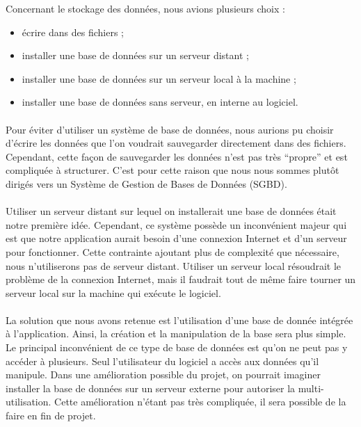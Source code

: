 Concernant le stockage des données, nous avions plusieurs choix :
\begin{itemize}
\item écrire dans des fichiers ;
\item installer une base de données sur un serveur distant ;
\item installer une base de données sur un serveur local à la machine ;
\item installer une base de données sans serveur, en interne au logiciel.
\end{itemize}

\paragraph{}
Pour éviter d’utiliser un système de base de données, nous aurions pu choisir
d’écrire les données que l’on voudrait sauvegarder directement dans des
fichiers. Cependant, cette façon de sauvegarder les données n’est pas très
“propre” et est compliquée à structurer. C’est pour cette raison que nous nous
sommes plutôt dirigés vers un Système de Gestion de Bases de Données (SGBD).

\paragraph{}
Utiliser un serveur distant sur lequel on installerait une base de données
était notre première idée. Cependant, ce système possède un inconvénient
majeur qui est que notre application aurait besoin d’une connexion Internet
et d’un serveur pour fonctionner. Cette contrainte ajoutant plus de complexité
que nécessaire, nous n'utiliserons pas de serveur distant. Utiliser un serveur
local résoudrait le problème de la connexion Internet, mais il faudrait tout
de même faire tourner un serveur local sur la machine qui exécute le logiciel.

\paragraph{}
La solution que nous avons retenue est l’utilisation d’une base de donnée
intégrée à l’application. Ainsi, la création et la manipulation de la base
sera plus simple. Le principal inconvénient de ce type de base de données est
qu’on ne peut pas y accéder à plusieurs. Seul l’utilisateur du logiciel a accès
aux données qu’il manipule. Dans une amélioration possible du projet, on
pourrait imaginer installer la base de données sur un serveur externe pour
autoriser la multi-utilisation. Cette amélioration n’étant pas très compliquée,
il sera possible de la faire en fin de projet.

